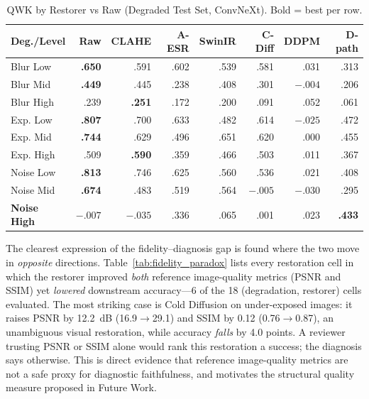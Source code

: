 \documentclass[runningheads]{llncs}
\begin{document}
\begin{table}[!t]
\caption{QWK by Restorer vs Raw (Degraded Test Set, ConvNeXt). Bold = best per row.}
\label{tab:qwk_recovery}
\begin{center}
\setlength{\tabcolsep}{3.5pt}
\small
\begin{tabular}{lrrrrrrr}
\toprule
\textbf{Deg./Level} & \textbf{Raw} & \textbf{CLAHE} & \textbf{A-ESR} & \textbf{SwinIR} & \textbf{C-Diff} & \textbf{DDPM} & \textbf{D-path} \\
\midrule
Blur Low      & \textbf{.650} & .591 & .602 & .539 & .581 & .031 & .313 \\
Blur Mid      & \textbf{.449} & .445 & .238 & .408 & .301 & $-.004$ & .206 \\
Blur High     & .239 & \textbf{.251} & .172 & .200 & .091 & .052 & .061 \\
Exp. Low      & \textbf{.807} & .700 & .633 & .482 & .614 & $-.025$ & .472 \\
Exp. Mid      & \textbf{.744} & .629 & .496 & .651 & .620 & .000 & .455 \\
Exp. High     & .509 & \textbf{.590} & .359 & .466 & .503 & .011 & .367 \\
Noise Low     & \textbf{.813} & .746 & .625 & .560 & .536 & .021 & .408 \\
Noise Mid     & \textbf{.674} & .483 & .519 & .564 & $-.005$ & $-.030$ & .295 \\
\textbf{Noise High} & $-.007$ & $-.035$ & .336 & .065 & .001 & .023 & \textbf{.433} \\
\bottomrule
\end{tabular}
\end{center}
\end{table}

The clearest expression of the fidelity--diagnosis gap is found where the two move in \textit{opposite} directions. Table~\ref{tab:fidelity_paradox} lists every restoration cell in which the restorer improved \textit{both} reference image-quality metrics (PSNR and SSIM) yet \textit{lowered} downstream accuracy---6 of the 18 (degradation, restorer) cells evaluated. The most striking case is Cold Diffusion on under-exposed images: it raises PSNR by 12.2~dB (16.9$\rightarrow$29.1) and SSIM by 0.12 (0.76$\rightarrow$0.87), an unambiguous visual restoration, while accuracy \textit{falls} by 4.0 points. A reviewer trusting PSNR or SSIM alone would rank this restoration a success; the diagnosis says otherwise. This is direct evidence that reference image-quality metrics are not a safe proxy for diagnostic faithfulness, and motivates the structural quality measure proposed in Future Work.
\end{document}
